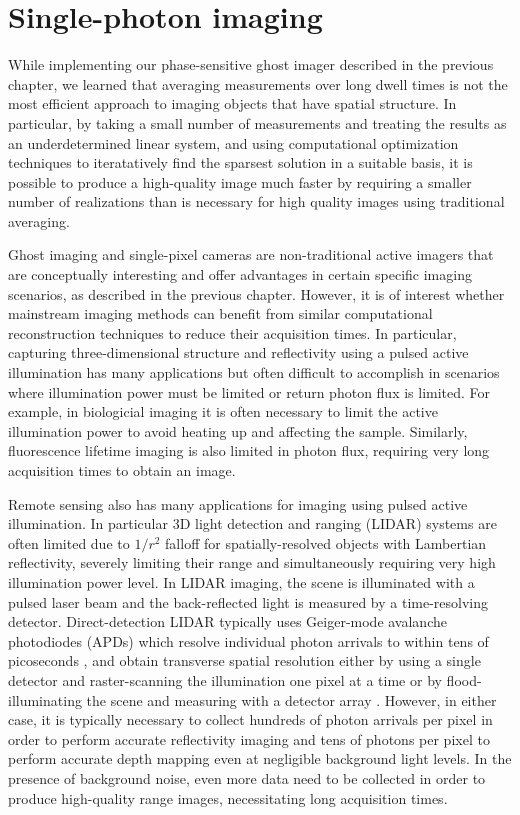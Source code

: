 \chapter{Single-photon imaging}

While implementing our phase-sensitive ghost imager described in the previous chapter, we learned that averaging measurements over long dwell times is not the most efficient approach to imaging objects that have spatial structure. In particular, by taking a small number of measurements and treating the results as an underdetermined linear system, and using computational optimization techniques to iteratatively find the sparsest solution in a suitable basis, it is possible to produce a high-quality image much faster by requiring a smaller number of realizations than is necessary for high quality images using traditional averaging.

Ghost imaging and single-pixel cameras are non-traditional active imagers that are conceptually interesting and offer advantages in certain specific imaging scenarios, as described in the previous chapter. However, it is of interest whether mainstream imaging methods can benefit from similar computational reconstruction techniques to reduce their acquisition times. In particular, capturing three-dimensional structure and reflectivity using a pulsed active illumination has many applications \cite{nicolas-applications} but often difficult to accomplish in scenarios where illumination power must be limited or return photon flux is limited. For example, in biologicial imaging it is often necessary to limit the active illumination power to avoid heating up and affecting the sample. Similarly, fluorescence lifetime imaging \cite{becker-fluorescence} is also limited in photon flux, requiring very long acquisition times to obtain an image.

Remote sensing also has many applications for imaging using pulsed active illumination. In particular 3D light detection and ranging (LIDAR) systems are often limited due to $1/r^2$ falloff for spatially-resolved objects with Lambertian reflectivity, severely limiting their range and simultaneously requiring very high illumination power level. In LIDAR imaging, the scene is illuminated with a pulsed laser beam and the back-reflected light is measured by a time-resolving detector. Direct-detection LIDAR typically uses Geiger-mode avalanche photodiodes (APDs) which resolve individual photon arrivals to within tens of picoseconds \cite{savage-single}, and obtain transverse spatial resolution either by using a single detector and raster-scanning the illumination one pixel at a time \cite{buller-ranging} or by flood-illuminating the scene and measuring with a detector array \cite{jack-hgcdte}. However, in either case, it is typically necessary to collect hundreds of photon arrivals per pixel in order to perform accurate reflectivity imaging and tens of photons per pixel to perform accurate depth mapping \cite{albota-three,degnan-photon,snyder-random,obrien-simulation,mccarthy-kilometer,pellegrini-laser} even at negligible background light levels. In the presence of background noise, even more data need to be collected in order to produce high-quality range images, necessitating long acquisition times.

